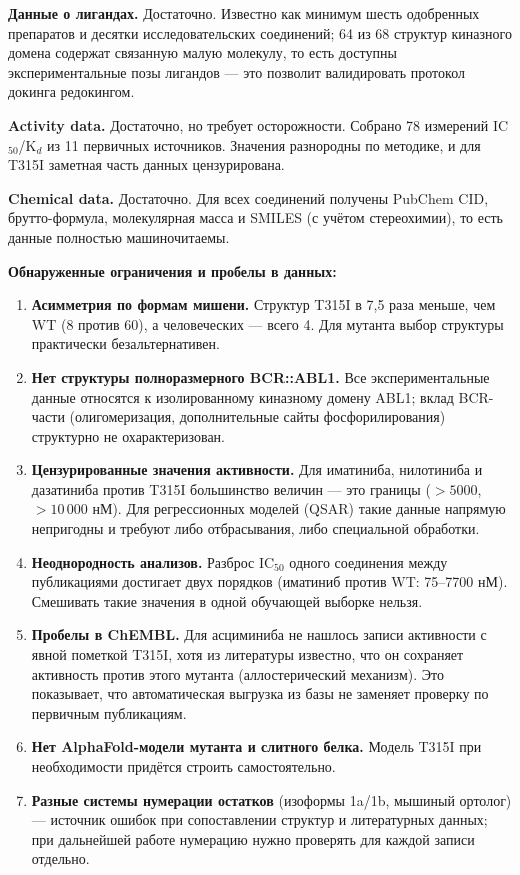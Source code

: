 \documentclass[12pt,a4paper]{article}
\begin{document}
\medskip
\noindent\textbf{Данные о лигандах.} Достаточно. Известно как минимум шесть одобренных
препаратов и десятки исследовательских соединений; 64 из 68 структур киназного домена
содержат связанную малую молекулу, то есть доступны экспериментальные позы лигандов ---
это позволит валидировать протокол докинга редокингом.

\medskip
\noindent\textbf{Activity data.} Достаточно, но требует осторожности. Собрано 78
измерений IC$_{50}$/K$_d$ из 11 первичных источников. Значения разнородны по
методике, и для T315I заметная часть данных цензурирована.

\medskip
\noindent\textbf{Chemical data.} Достаточно. Для всех соединений получены PubChem CID,
брутто-формула, молекулярная масса и SMILES (с учётом стереохимии), то есть данные
полностью машиночитаемы.

\medskip
\noindent\textbf{Обнаруженные ограничения и пробелы в данных:}
\begin{enumerate}[leftmargin=*,topsep=2pt,itemsep=3pt]
\item \textbf{Асимметрия по формам мишени.} Структур T315I в 7{,}5 раза меньше, чем WT
(8 против 60), а человеческих --- всего 4. Для мутанта выбор структуры практически
безальтернативен.
\item \textbf{Нет структуры полноразмерного BCR::ABL1.} Все экспериментальные данные
относятся к изолированному киназному домену ABL1; вклад BCR-части (олигомеризация,
дополнительные сайты фосфорилирования) структурно не охарактеризован.
\item \textbf{Цензурированные значения активности.} Для иматиниба, нилотиниба и
дазатиниба против T315I большинство величин --- это границы ($>5000$, $>10\,000$ нМ).
Для регрессионных моделей (QSAR) такие данные напрямую непригодны и требуют либо
отбрасывания, либо специальной обработки.
\item \textbf{Неоднородность анализов.} Разброс IC$_{50}$ одного соединения между
публикациями достигает двух порядков (иматиниб против WT: 75--7700 нМ). Смешивать такие
значения в одной обучающей выборке нельзя.
\item \textbf{Пробелы в ChEMBL.} Для асциминиба не нашлось записи активности с
явной пометкой T315I, хотя из литературы известно, что он сохраняет активность против
этого мутанта (аллостерический механизм). Это показывает, что автоматическая выгрузка
из базы не заменяет проверку по первичным публикациям.
\item \textbf{Нет AlphaFold-модели мутанта и слитного белка.} Модель T315I при
необходимости придётся строить самостоятельно.
\item \textbf{Разные системы нумерации остатков} (изоформы 1a/1b, мышиный ортолог) ---
источник ошибок при сопоставлении структур и литературных данных; при дальнейшей
работе нумерацию нужно проверять для каждой записи отдельно.
\end{enumerate}
\end{document}
